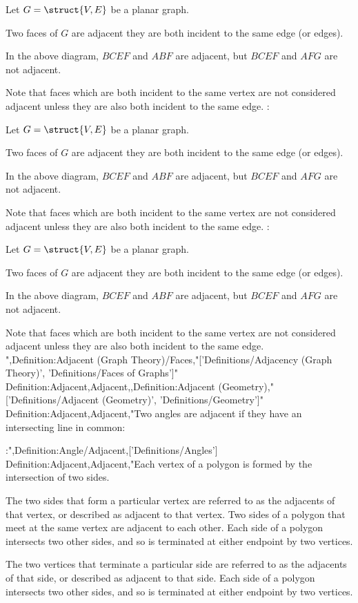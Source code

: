 Let $G = \struct {V, E}$ be a planar graph.

Two faces of $G$ are adjacent  they are both incident to the same edge (or edges).

In the above diagram, $BCEF$ and $ABF$ are adjacent, but $BCEF$ and $AFG$ are not adjacent.


Note that faces which are both incident to the same vertex are not considered adjacent unless they are also both incident to the same edge.
:

Let $G = \struct {V, E}$ be a planar graph.

Two faces of $G$ are adjacent  they are both incident to the same edge (or edges).

In the above diagram, $BCEF$ and $ABF$ are adjacent, but $BCEF$ and $AFG$ are not adjacent.


Note that faces which are both incident to the same vertex are not considered adjacent unless they are also both incident to the same edge.
:

Let $G = \struct {V, E}$ be a planar graph.

Two faces of $G$ are adjacent  they are both incident to the same edge (or edges).

In the above diagram, $BCEF$ and $ABF$ are adjacent, but $BCEF$ and $AFG$ are not adjacent.


Note that faces which are both incident to the same vertex are not considered adjacent unless they are also both incident to the same edge.
",Definition:Adjacent (Graph Theory)/Faces,"['Definitions/Adjacency (Graph Theory)', 'Definitions/Faces of Graphs']"
Definition:Adjacent,Adjacent,,Definition:Adjacent (Geometry),"['Definitions/Adjacent (Geometry)', 'Definitions/Geometry']"
Definition:Adjacent,Adjacent,"Two angles are adjacent if they have an intersecting line in common:

:",Definition:Angle/Adjacent,['Definitions/Angles']
Definition:Adjacent,Adjacent,"Each vertex of a polygon is formed by the intersection of two sides.

The two sides that form a particular vertex are referred to as the adjacents of that vertex, or described as adjacent to that vertex.
Two sides of a polygon that meet at the same vertex are adjacent to each other.
Each side of a polygon intersects two other sides, and so is terminated at either endpoint by two vertices.

The two vertices that terminate a particular side are referred to as the adjacents of that side, or described as adjacent to that side.
Each side of a polygon intersects two other sides, and so is terminated at either endpoint by two vertices.


